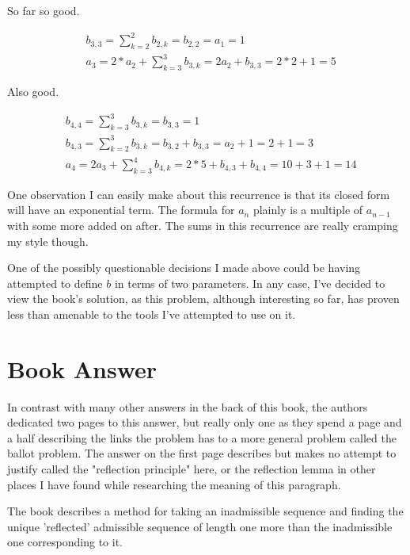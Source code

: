 \documentclass{article}
\begin{document}
So far so good.

\begin{align*}
  &b_{3,3} = \sum_{k=2}^{2} b_{2,k} = b_{2,2} = a_1 = 1 \\
  &a_3 = 2 * a_2 + \sum_{k=3}^{3} b_{3,k} = 2a_2 + b_{3,3} = 2 * 2 + 1 = 5
\end{align*}

Also good.

\begin{align*}
  &b_{4,4} = \sum_{k=3}^{3} b_{3,k} = b_{3,3} = 1 \\
  &b_{4,3} = \sum_{k=2}^{3} b_{3,k} = b_{3,2} + b_{3,3} = a_2 + 1 = 2 + 1 = 3 \\
  &a_4 = 2 a_{3} + \sum_{k=3}^{4} b_{4,k} = 2 * 5 + b_{4,3} + b_{4,4} = 10 + 3 + 1 = 14
\end{align*}

One observation I can easily make about this recurrence is that its closed form will have an exponential term.  The formula for $a_n$ plainly is a multiple of $a_{n-1}$ with some more added on after.  The sums in this recurrence are really cramping my style though.

One of the possibly questionable decisions I made above could be having attempted to define $b$ in terms of two parameters.  In any case, I've decided to view the book's solution, as this problem, although interesting so far, has proven less than amenable to the tools I've attempted to use on it.

\section*{
  Book Answer
}

In contrast with many other answers in the back of this book, the authors dedicated two pages to this answer, but really only one as they spend a page and a half describing the links the problem has to a more general problem called the ballot problem.  The answer on the first page describes but makes no attempt to justify called the "reflection principle" here, or the reflection lemma in other places I have found while researching the meaning of this paragraph.

\par

The book describes a method for taking an inadmissible sequence and finding the unique 'reflected' admissible sequence of length one more than the inadmissible one corresponding to it.
\end{document}
